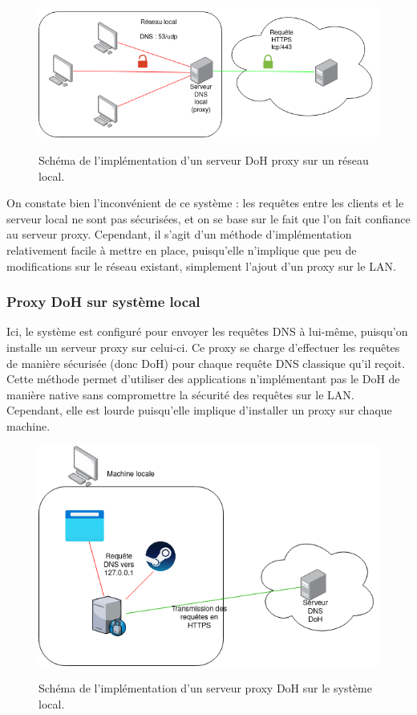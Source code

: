 \documentclass[a4paper,12pt]{article}
\begin{document}
	\begin{figure}[H]
		\begin{center}
			{\includegraphics[scale=0.6]{Images/schema_doh_proxy_lan.png}}
		\end{center}
		\caption{Schéma de l'implémentation d'un serveur DoH proxy sur un réseau local.}
	\end{figure}
	
	On constate bien l'inconvénient de ce système : les requêtes entre les clients et le serveur local ne sont pas sécurisées, et on se base sur le fait que l'on fait confiance au serveur proxy.
	Cependant, il s'agit d'un méthode d'implémentation relativement facile à mettre en place, puisqu'elle n'implique que peu de modifications sur le réseau existant, simplement l'ajout d'un proxy sur le LAN.
	
	\subsubsection{Proxy DoH sur système local}
	
	Ici, le système est configuré pour envoyer les requêtes DNS à lui-même, puisqu'on installe un serveur proxy sur celui-ci. Ce proxy se charge d'effectuer les requêtes de manière sécurisée (donc DoH) pour chaque requête DNS classique qu'il reçoit.
	Cette méthode permet d'utiliser des applications n'implémentant pas le DoH de manière native sans compromettre la sécurité des requêtes sur le LAN. Cependant, elle est lourde puisqu'elle implique d'installer un proxy sur chaque machine.
	
	\begin{figure}[H]
		\begin{center}
			{\includegraphics[scale=0.6]{Images/schema_doh_proxy_local.png}}
		\end{center}
		\caption{Schéma de l'implémentation d'un serveur proxy DoH sur le système local.}
	\end{figure}
	
\end{document}
